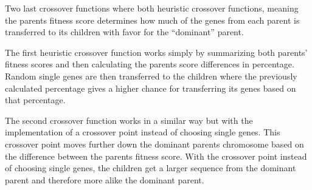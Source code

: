 Two last crossover functions where both heuristic crossover functions, meaning the parents fitness score determines how much of the genes from each parent is transferred to its children with favor for the “dominant” parent. 

The first heuristic crossover function works simply by summarizing both parents' fitness scores and then calculating the parents score differences in percentage. Random single genes are then transferred to the children where the previously calculated percentage gives a higher chance for transferring its genes based on that percentage.

The second crossover function works in a similar way but with the implementation of a crossover point instead of choosing single genes. This crossover point moves further down the dominant parents chromosome based on the difference between the parents fitness score. With the crossover point instead of choosing single genes, the children get a larger sequence from the dominant parent and therefore more alike the dominant parent.
